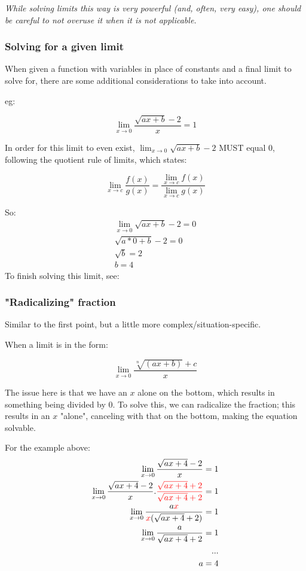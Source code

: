 \documentclass[12pt]{article}
\begin{document}
\textit{While solving limits this way is very powerful (and, often, very easy), one should be careful to not overuse it when it is not applicable.}

\subsubsection{Solving for a given limit}

When given a function with variables in place of constants and a final limit to solve for, there are some additional considerations to take into account.

eg:

$$\lim_{x\to0}\frac{\sqrt{ax + b} - 2}{x} = 1$$

In order for this limit to even exist, $\lim_{x\to0} \sqrt{ax + b} - 2$ MUST equal 0, following the quotient rule of limits, which states:

$$\lim_{x\to c} \frac{f(x)}{g(x)} = \frac{\lim_{x\to c} f(x)}{\lim_{x\to c} g(x)}$$

So:
\begin{equation}
\begin{split}
    \lim_{x\to0} \sqrt{ax + b} - 2 = 0\\
    \sqrt{a*0 + b} - 2 = 0\\
    \sqrt{b} = 2\\
    b = 4
\end{split}
\end{equation}
To finish solving this limit, see:

\subsubsection{"Radicalizing" fraction}

Similar to the first point, but a little more complex/situation-specific.

When a limit is in the form:

$$\lim_{x\to 0}\frac{\sqrt[n]{(ax+b)} + c}{x}$$

The issue here is that we have an $x$ alone on the bottom, which results in something being divided by 0. To solve this, we can radicalize the fraction; this results in an $x$ "alone", canceling with that on the bottom, making the equation solvable.

For the example above:
\begin{equation}
\begin{split}
    \lim_{x\to0} \frac{\sqrt{ax + 4} - 2}{x} = 1\\
    \lim_{x\to0} \frac{\sqrt{ax + 4} - 2}{x}.\textcolor{red}{\frac{\sqrt{ax + 4} + 2}{\sqrt{ax + 4} + 2}} = 1\\
    \lim_{x\to0} \frac{a\textcolor{red}{x}}{\textcolor{red}{x}(\sqrt{ax+4}+2)} = 1\\
    \lim_{x\to 0} \frac{a}{\sqrt{ax + 4} + 2} = 1\\
    ...\\
    a = 4
\end{split}
\end{equation}
\end{document}
